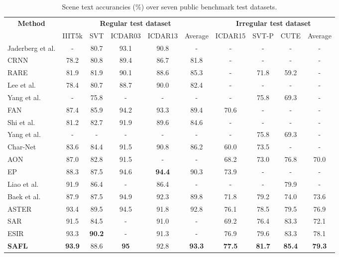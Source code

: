 \begin{table*}[t]
  \centering
\caption{Scene text accurancies (\%) over seven public benchmark test datasets.}
\label{tab:CompareSOTA}
  \begin{tabular}{|l|cccc||c|ccc||c|}
\hline
\multicolumn{1}{|c|}{\multirow{2}{*}{\textbf{Method}}} & \multicolumn{5}{c|}{\textbf{Regular test dataset}}& \multicolumn{4}{c|}{\textbf{Irregular test dataset}} \\ \cline{2-10} 
\multicolumn{1}{|c|}{} & IIIT5k & SVT & ICDAR03 & ICDAR13 &Average & ICDAR15 & SVT-P & CUTE & Average  \\ \hline
Jaderberg et al. \cite{jaderberg2014deep} & - & 80.7 & 93.1  & 90.8  & - & - & - & - & - \\
CRNN \cite{shi2016end} & 78.2 & 80.8 & 89.4 & 86.7 & 81.8 & - & - & - & - \\ 
RARE \cite{shi2016robust} & 81.9 & 81.9 & 90.1 & 88.6 & 85.3 & - & 71.8 & 59.2 & - \\ 
Lee et al. & 78.4 & 80.7& 88.7 & 90.0 & 82.4 & - & - & - & - \\ 
Yang et al. \cite{yang2017learning} & - & 75.8 & - & - & - & - & 75.8 & 69.3 & - \\ 
FAN \cite{cheng2017focusing} & 87.4 & 85.9 & 94.2 & 93.3 & 89.4 & 70.6 & - & - & - \\
Shi et al. \cite{shi2016robust} & 81.2 & 82.7 & 91.9 & 89.6 & 84.6 & - & - & - & - \\
Yang et al. \cite{yang2017learning} & - & - & - & - & - & - & 75.8 & 69.3 & - \\ 
Char-Net \cite{liu2018char}  & 83.6 & 84.4 & 91.5 & 90.8 & 86.2 & 60.0 & 73.5 & - & - \\ 
AON \cite{cheng2018aon}& 87.0 & 82.8 & 91.5 & - & - & 68.2 & 73.0 & 76.8 & 70.0 \\
EP \cite{bai2018edit}& 88.3 & 87.5 & 94.6 &\textbf{ 94.4} & 90.3 & 73.9 & - & - & - \\
Liao et al. \cite{liao2019scene} & 91.9 & 86.4 & - & 86.4 & - & - & - & 79.9 & - \\
Baek et al. \cite{baek2019wrong} & 87.9 & 87.5 & 94.9 & 92.3 & 89.8 & 71.8 & 79.2 & 74.0 & 73.6 \\ 
ASTER \cite{shi2018aster}& 93.4 & 89.5 & 94.5 & 91.8 & 92.8 & 76.1 & 78.5 & 79.5 & 76.9 \\ 
SAR \cite{li2019show}& 91.5 & 84.5 & - & 91.0 & - & 69.2 & 76.4 & 83.3 & 72.1 \\
ESIR \cite{zhan2019esir} & 93.3 & \textbf{90.2} & - & 91.3 & - & 76.9 & 79.6 & 83.3 & 78.1 \\
\hline
\textbf{SAFL}   & \textbf{93.9} & 88.6 & \textbf{95}& 92.8 & \textbf{93.3} & \textbf{77.5} & \textbf{81.7} & \textbf{85.4} & \textbf{79.3} \\ \hline
\end{tabular}
\end{table*}
